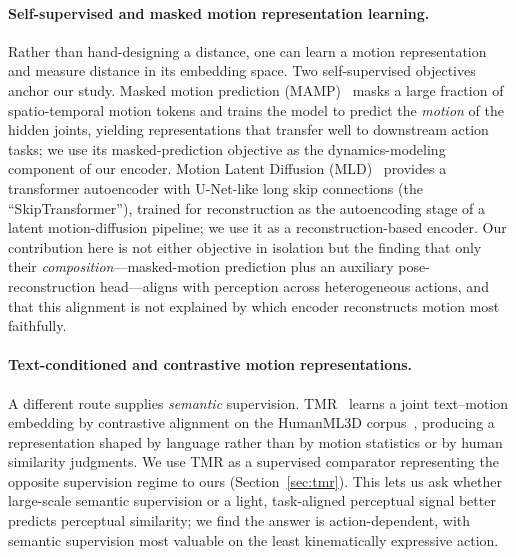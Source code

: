 \documentclass[letterpaper]{article} %
\begin{document}
\paragraph{Self-supervised and masked motion representation learning.}
Rather than hand-designing a distance, one can learn a motion representation and measure distance in
its embedding space. Two self-supervised objectives anchor our study. Masked motion prediction
(MAMP)~\citep{mao2023mamp} masks a large fraction of spatio-temporal motion tokens and trains the
model to predict the \emph{motion} of the hidden joints, yielding representations that transfer well
to downstream action tasks; we use its masked-prediction objective as the dynamics-modeling component
of our encoder. Motion Latent Diffusion (MLD)~\citep{chen2023mld} provides a transformer autoencoder
with U-Net-like long skip connections (the ``SkipTransformer''), trained for reconstruction as the
autoencoding stage of a latent motion-diffusion pipeline; we use it as a reconstruction-based encoder.
Our contribution here is not either objective in isolation but the finding that only their
\emph{composition}---masked-motion prediction plus an auxiliary pose-reconstruction head---aligns with
perception across heterogeneous actions, and that this alignment is not explained by which encoder
reconstructs motion most faithfully.

\paragraph{Text-conditioned and contrastive motion representations.}
A different route supplies \emph{semantic} supervision. TMR~\citep{petrovich2023tmr} learns a joint
text--motion embedding by contrastive alignment on the HumanML3D corpus~\citep{guo2022humanml3d},
producing a representation shaped by language rather than by motion statistics or by human
similarity judgments. We use TMR as a supervised comparator representing the opposite supervision
regime to ours (Section~\ref{sec:tmr}). This lets us ask whether large-scale semantic supervision or a light,
task-aligned perceptual signal better predicts perceptual similarity; we find the answer is
action-dependent, with semantic supervision most valuable on the least kinematically expressive
action.
\end{document}
